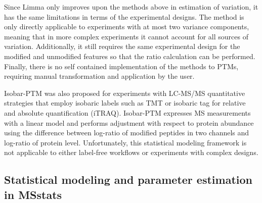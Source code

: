 \documentclass[mcp]{article}
\numberwithin{table}{section}
\begin{document}
Since Limma only improves upon the methods above in estimation of variation, it has the same limitations in terms of the experimental designs. The method is only directly applicable to experiments with at most two variance components, meaning that in more complex experiments it cannot account for all sources of variation. Additionally, it still requires the same experimental design for the modified and unmodified features so that the ratio calculation can be performed. Finally, there is no self contained implementation of the methods to PTMs, requiring manual transformation and application by the user.


\medskip {} \medskip \noindent Isobar-PTM was also proposed for experiments with LC-MS/MS quantitative strategies that employ isobaric labels such as TMT or isobaric tag for relative and absolute quantification (iTRAQ)\cite{Breitwieser:2013}. Isobar-PTM expresses MS measurements with a linear model and performs adjustment with respect to protein abundance using the difference between log-ratio of modified peptides in two channels and log-ratio of protein level. Unfortunately, this statistical modeling framework is not applicable to either label-free workflows or experiments with complex designs. 


\subsection*{Statistical modeling and parameter estimation in MSstats}
\end{document}
